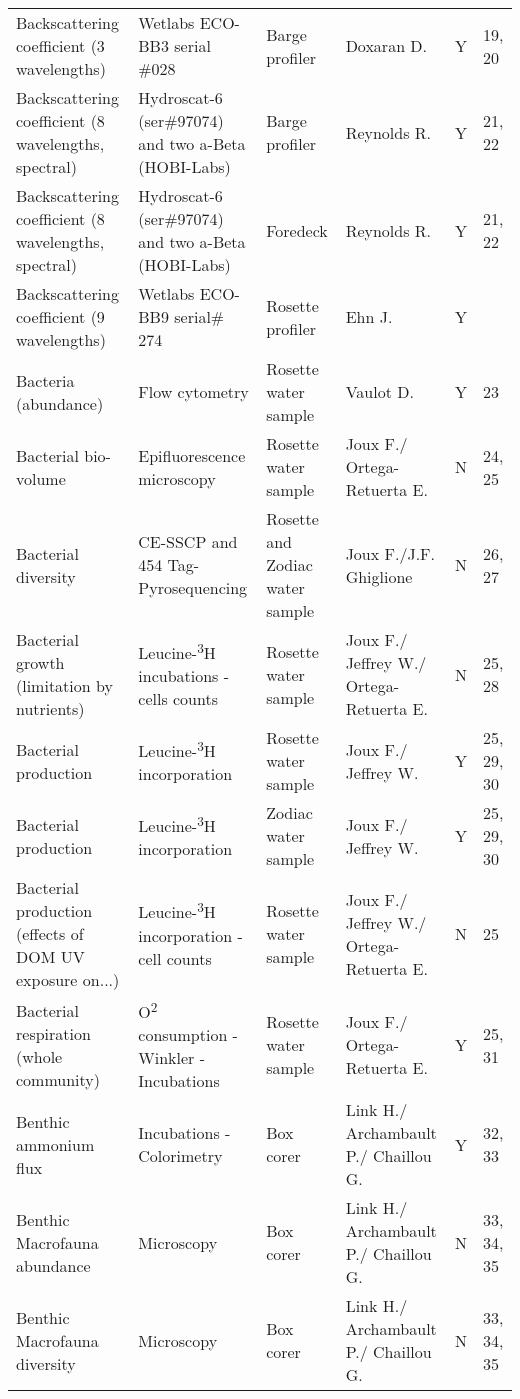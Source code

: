 \begin{ThreePartTable}
\begin{longtable}[t]{llllll}
Backscattering coefficient (3 wavelengths) & Wetlabs ECO-BB3 serial \#028 & Barge profiler & Doxaran D. & Y & 19, 20\\
\addlinespace
Backscattering coefficient (8 wavelengths, spectral) & Hydroscat-6 (ser\#97074) and two a-Beta (HOBI-Labs) & Barge profiler & Reynolds R. & Y & 21, 22\\
Backscattering coefficient (8 wavelengths, spectral) & Hydroscat-6 (ser\#97074) and two a-Beta (HOBI-Labs) & Foredeck & Reynolds R. & Y & 21, 22\\
Backscattering coefficient (9 wavelengths) & Wetlabs ECO-BB9 serial\# 274 & Rosette profiler & Ehn J. & Y & \\
Bacteria (abundance) & Flow cytometry & Rosette water sample & Vaulot D. & Y & 23\\
Bacterial bio-volume & Epifluorescence microscopy & Rosette water sample & Joux F./ Ortega-Retuerta E. & N & 24, 25\\
\addlinespace
Bacterial diversity & CE-SSCP and 454 Tag-Pyrosequencing & Rosette and Zodiac water sample & Joux F./J.F. Ghiglione & N & 26, 27\\
Bacterial growth (limitation by nutrients) & Leucine-\textsuperscript{3}H incubations - cells counts & Rosette water sample & Joux F./ Jeffrey W./ Ortega-Retuerta E. & N & 25, 28\\
Bacterial production & Leucine-\textsuperscript{3}H incorporation & Rosette water sample & Joux F./ Jeffrey W. & Y & 25, 29, 30\\
Bacterial production & Leucine-\textsuperscript{3}H incorporation & Zodiac water sample & Joux F./ Jeffrey W. & Y & 25, 29, 30\\
Bacterial production (effects of DOM UV exposure on...) & Leucine-\textsuperscript{3}H incorporation - cell counts & Rosette water sample & Joux F./ Jeffrey W./ Ortega-Retuerta E. & N & 25\\
\addlinespace
Bacterial respiration (whole community) & O\textsuperscript{2} consumption - Winkler - Incubations & Rosette water sample & Joux F./ Ortega-Retuerta E. & Y & 25, 31\\
Benthic ammonium flux & Incubations - Colorimetry & Box corer & Link H./ Archambault P./ Chaillou G. & Y & 32, 33\\
Benthic Macrofauna abundance & Microscopy & Box corer & Link H./ Archambault P./ Chaillou G. & N & 33, 34, 35\\
Benthic Macrofauna diversity & Microscopy & Box corer & Link H./ Archambault P./ Chaillou G. & N & 33, 34, 35\\

\end{longtable}
\end{ThreePartTable}
